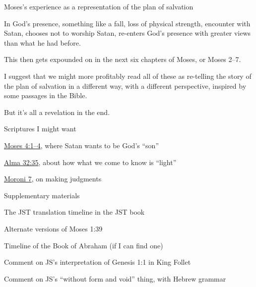 \begin{compactitem}
			\item Moses's experience as a representation of the plan of salvation
				\begin{compactitem}
					\item In God's presence, something like a fall, loss of physical strength, encounter with Satan, chooses not to worship Satan, re-enters God's presence with greater views than what he had before.
					\item This then gets expounded on in the next six chapters of Moses, or Moses 2--7.
					\item I suggest that we might more profitably read all of these as re-telling the story of the plan of salvation in a different way, with a different perspective, inspired by some passages in the Bible.
						\begin{compactitem}
							\item But it's all a revelation in the end.
						\end{compactitem}
				\end{compactitem}
				
			\item Scriptures I might want
				\begin{compactitem}
					\item \hyperref[MOSES-4-1]{Moses 4:1--4}, where Satan wants to be God's ``son''
					\item \hyperref[ALMA-32-35]{Alma 32:35}, about how what we come to know is ``light''
					\item \hyperref[MORONI-7]{Moroni 7}, on making judgments
				\end{compactitem}
			
			\item Supplementary materials
				\begin{compactitem}
					\item The JST translation timeline in the JST book
					\item Alternate versions of Moses 1:39
					\item Timeline of the Book of Abraham (if I can find one)
					\item Comment on JS's interpretation of Genesis 1:1 in King Follet
					\item Comment on JS's ``without form and void'' thing, with Hebrew grammar
				\end{compactitem}
		
		\end{compactitem}
	
